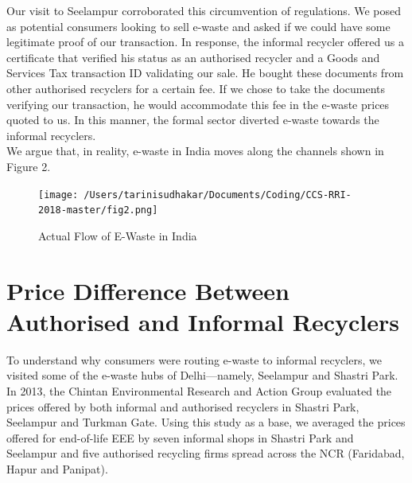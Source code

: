 \documentclass[a4paper, 12pt]{article}
\begin{document}
                    Our visit to Seelampur corroborated this circumvention of regulations. We posed as potential consumers looking to sell e-waste and asked if we could have some legitimate proof of our transaction. In response, the informal recycler offered us a certificate that verified his status as an authorised recycler and a Goods and Services Tax transaction ID validating our sale. He bought these documents from other authorised recyclers for a certain fee. If we chose to take the documents verifying our transaction, he would accommodate this fee in the e-waste prices quoted to us. In this manner, the formal sector diverted e-waste towards the informal recyclers. \\
                    
                    We argue that, in reality, e-waste in India moves along the channels shown in Figure 2. \\
                    
                    \begin{figure}[H]
                    	\centering
                    	\texttt{[image: /Users/tarinisudhakar/Documents/Coding/CCS-RRI-2018-master/fig2.png]}
                    	\caption[Optional Caption]{Actual Flow of E-Waste in India}
                    \end{figure}
                    
                    \section{Price Difference Between Authorised and Informal Recyclers}
                    
                    To understand why consumers were routing e-waste to informal recyclers, we visited some of the e-waste hubs of Delhi—namely, Seelampur and Shastri Park.\\
                     
                     In 2013, the Chintan Environmental Research and Action Group evaluated the prices offered by both informal and authorised recyclers in Shastri Park, Seelampur and Turkman Gate. Using this study as a base, we averaged the prices offered for end-of-life EEE by seven informal shops in Shastri Park and Seelampur and five authorised recycling firms spread across the NCR (Faridabad, Hapur and Panipat).\\
                     
\end{document}
